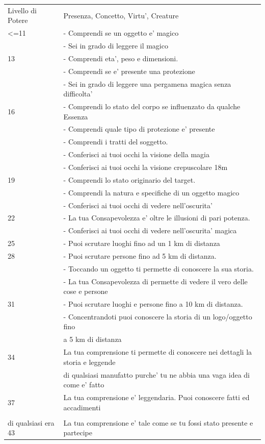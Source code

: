 \documentclass[a4paper,11pt,twoside,openany]{dndbook}
\begin{document}
\begin{tabular}[c]{@{}ll@{}}
\toprule 
Livello di Potere & Presenza, Concetto, Virtu', Creature\tabularnewline
<=11 &- Comprendi se un oggetto e’ magico
\\
&- Sei in grado di leggere il magico
\\
13& - Comprendi eta’, peso e dimensioni.
\\
&- Comprendi se e’ presente una protezione
\\
&- Sei in grado di leggere una pergamena magica senza difficolta’
\\
16& -
Comprendi lo stato del corpo se influenzato da qualche Essenza
\\
&- Comprendi quale tipo di protezione e’ presente
\\
&- Comprendi i tratti del soggetto.
\\
&- Conferisci ai tuoi occhi la visione della magia
\\
&- Conferisci ai tuoi occhi la visione crepuscolare 18m\\
19& - Comprendi lo stato originario del target.
\\
&- Comprendi la natura e specifiche di un oggetto magico
\\
&- Conferisci ai tuoi occhi di vedere nell’oscurita’
\\
22& - La tua Consapevolezza e’ oltre le illusioni di pari potenza.
\\
&- Conferisci ai tuoi occhi di vedere nell’oscurita’ magica
\\
25& - Puoi scrutare luoghi fino ad un 1 km di distanza
\\
28& - Puoi scrutare persone fino ad 5 km di distanza.
\\
&- Toccando un oggetto ti permette di conoscere la sua storia.
\\
&- La tua Consapevolezza di permette di vedere il vero delle cose e persone
\\
31& - Puoi scrutare luoghi e persone fino a 10 km di distanza.
\\
&- Concentrandoti puoi conoscere la storia di un logo/oggetto fino\\
& a 5 km di distanza\\
34& La tua comprensione ti permette di conoscere nei dettagli la storia e
leggende\\
& di qualsiasi manufatto purche’ tu ne abbia una vaga idea di come e’ fatto\\
37& La tua comprensione e’ leggendaria. Puoi conoscere fatti ed accadimenti \\
&\\di qualsiasi era
43& La tua comprensione e’ tale come se tu fossi stato presente e partecipe
\\
\bottomrule
\end{tabular}
\end{document}

